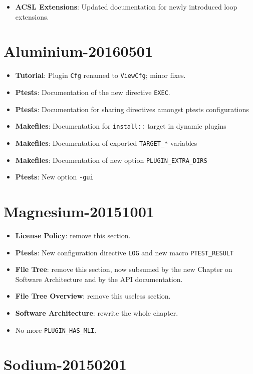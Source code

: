 \begin{itemize}
\item\textbf{ACSL Extensions}: Updated documentation for newly
introduced loop extensions.
\end{itemize}

\section*{Aluminium-20160501}

\begin{itemize}
\item \textbf{Tutorial}: Plugin \texttt{Cfg} renamed to \texttt{ViewCfg};
  minor fixes.
\item \textbf{Ptests}: Documentation of the new directive \texttt{EXEC}.
\item \textbf{Ptests}: Documentation for sharing directives amongst ptests
  configurations
\item \textbf{Makefiles}: Documentation for \texttt{install::} target
 in dynamic plugins
\item \textbf{Makefiles}: Documentation of exported \texttt{TARGET\_*} variables
\item \textbf{Makefiles}: Documentation of new option
\texttt{PLUGIN\_EXTRA\_DIRS}
\item \textbf{Ptests}: New option \texttt{-gui}
\end{itemize}

\section*{Magnesium-20151001}

\begin{itemize}
\item \textbf{License Policy}: remove this section.
\item \textbf{Ptests}: New configuration directive \texttt{LOG} and new macro
  \texttt{PTEST\_RESULT}
\item \textbf{File Tree}: remove this section, now subsumed by the new Chapter
  on Software Architecture and by the API documentation.
\item \textbf{File Tree Overview}: remove this useless section.
\item \textbf{Software Architecture}: rewrite the whole chapter.
\item No more \texttt{PLUGIN\_HAS\_MLI}.
\end{itemize}

\section*{Sodium-20150201}

